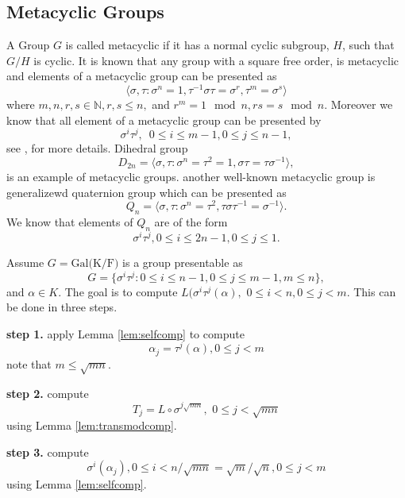 \subsection{Metacyclic Groups}

A Group $G$ is called metacyclic if it has a normal cyclic subgroup, $H$, such that $G/H$ is cyclic. It is known that any group
with a square free order, is metacyclic and elements of a metacyclic group can be presented as 
\begin{equation}\label{eq:metacyclic}
\langle \sigma,\tau: \sigma^n = 1, \tau^{-1}\sigma \tau = \sigma^r, \tau ^m = \sigma^s \rangle
\end{equation}
where $m,n,r,s \in \mathbb{N}, r,s \leq n,$ and $r^m = 1 \mod n , rs = s \mod n$. Moreover we know that all element of a metacyclic
 group can be presented by $$\sigma^i \tau^j, \,\,\, 0\leq i \leq m-1, 0\leq j \leq n-1,$$ 
see \cite[P.88, Proposition 1]{Johnson}, \cite[P.334]{Curtis} for more details. Dihedral group 
$$D_{2n} = \langle \sigma,\tau: \sigma^n =\tau^2 = 1, \sigma \tau = \tau \sigma^{-1} \rangle, $$
is an example of metacyclic groups. another well-known metacyclic group is generalizewd quaternion
 group which can be presented as
 $$Q_n = \langle \sigma,\tau: \sigma^n =\tau^2, \tau \sigma \tau^{-1} = \sigma^{-1} \rangle.$$
 We know that elements of $Q_n$ are of the form 
 $$\sigma^i\tau^j, 0 \leq i \leq 2n-1 , 0\leq j \leq 1.$$
 
Assume $G = \mathrm{Gal(K/F})$ is a group presentable as
$$G = \lbrace \sigma^i \tau^j: 0\leq i \leq n-1, 0 \leq j \leq m-1, m\leq n \rbrace,$$
and $\alpha\in K$. The goal is to compute 
$L(\sigma^i\tau^j (\alpha), \,\, 0\leq i < n, 0 \leq j <m.$
This can be done in three steps.

\textbf{step 1.} apply Lemma \ref{lem:selfcomp} to compute 
$$\alpha_j = \tau^j(\alpha), 0 \leq j < m$$
note that $m \leq \sqrt{mn}$.

\textbf{step 2.} compute $$T_j = L \circ \sigma^{j\sqrt{mn}}, \,\, 0\leq j < \sqrt{mn}$$
using Lemma	\ref{lem:transmodcomp}.

\textbf{step 3.} compute $$\sigma^i (\alpha_j), 0\leq i < n/\sqrt{mn} = \sqrt{m}/\sqrt{n}, 0\leq j <m$$ using Lemma \ref{lem:selfcomp}.

